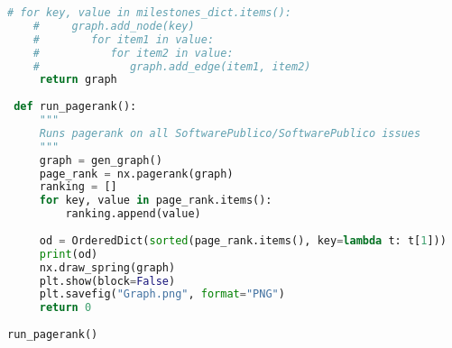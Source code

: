 \begin{apendicesenv}
\begin{lstlisting}[language=Python, caption=Algoritmo para mineração e análise das \textit{issues} do SPB]
    # for key, value in milestones_dict.items():
    #     graph.add_node(key)
    #        for item1 in value:
    #           for item2 in value:
    #              graph.add_edge(item1, item2)
     return graph
 
 def run_pagerank():
     """
     Runs pagerank on all SoftwarePublico/SoftwarePublico issues
     """
     graph = gen_graph()
     page_rank = nx.pagerank(graph)
     ranking = []
     for key, value in page_rank.items():
         ranking.append(value)
     
     od = OrderedDict(sorted(page_rank.items(), key=lambda t: t[1]))
     print(od)
     nx.draw_spring(graph)
     plt.show(block=False)
     plt.savefig("Graph.png", format="PNG")
     return 0
 
run_pagerank()
\end{lstlisting}
\end{apendicesenv}

